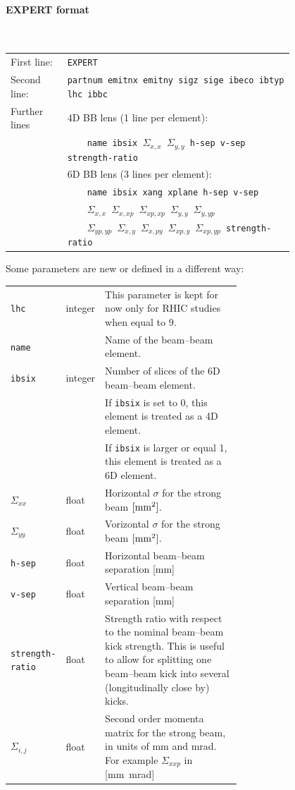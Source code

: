 \paragraph{EXPERT format}~\\

\bigskip
\begin{longtabu}{@{}lp{0.8\linewidth}}
    First line:   & \texttt{EXPERT} \\
    Second line:  & \texttt{partnum emitnx emitny sigz sige ibeco ibtyp lhc ibbc} \\
    Further lines & 4D BB lens (1 line per element): \\
                  & ~~~~\texttt{name ibsix $\Sigma_{x,x}$ $\Sigma_{y,y}$ h-sep v-sep strength-ratio} \\
                  & 6D BB lens (3 lines per element): \\
                  & ~~~~\texttt{name ibsix xang xplane h-sep v-sep} \\
                  & ~~~~\texttt{$\Sigma_{x,x}$ $\Sigma_{x,xp}$ $\Sigma_{xp,xp}$ $\Sigma_{y,y}$ $\Sigma_{y,yp}$} \\
                  & ~~~~\texttt{$\Sigma_{yp,yp}$ $\Sigma_{x,y}$ $\Sigma_{x,py}$ $\Sigma_{xp,y}$ $\Sigma_{xp,yp}$ strength-ratio}
\end{longtabu}

\bigskip
Some parameters are new or defined in a different way:

\bigskip
\begin{longtabu}{@{}llp{0.65\linewidth}}
    \texttt{lhc}   & integer & This parameter is kept for now only for RHIC studies when equal to 9. \\
    \texttt{name}  &         & Name of the beam--beam element. \\
    \texttt{ibsix} & integer & Number of slices of the 6D beam--beam element.\\
                   &         & If \texttt{ibsix} is set to 0, this element is treated as a 4D element.\\
                   &         & If \texttt{ibsix} is larger or equal 1, this element is treated as a 6D element. \\
    $\Sigma_{xx}$  & float   & Horizontal $\sigma$ for the strong beam $\rm{[mm^2]}$. \\
    $\Sigma_{yy}$  & float   & Vorizontal $\sigma$ for the strong beam $\rm{[mm^2]}$. \\
    \texttt{h-sep} & float   & Horizontal beam--beam separation [mm] \\
    \texttt{v-sep} & float   & Vertical beam--beam separation [mm] \\
    \texttt{strength-ratio} & float & Strength ratio with respect to the nominal beam--beam kick strength. This is useful to allow for splitting one beam--beam kick into several (longitudinally close by) kicks.\\
    $\Sigma_{i,j}$ & float   & Second order momenta matrix for the strong beam, in units of mm and mrad. For example $\Sigma_{xxp}$ in [mm\ mrad]
\end{longtabu}

